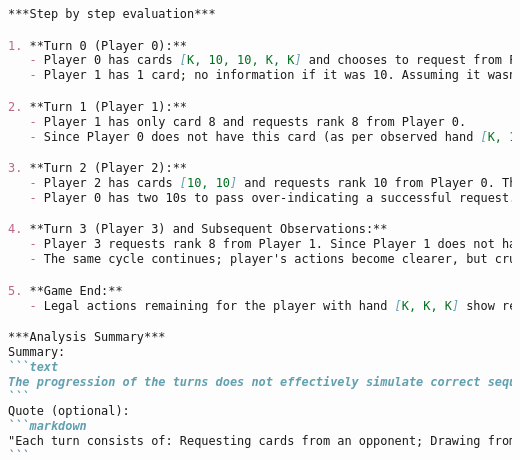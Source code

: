 \begin{tcolorbox}[
breakable,
title=Consistency validation results,  
colframe=gray, 
colback=white,
]
\begin{lstlisting}[language=markdown]
***Step by step evaluation***

1. **Turn 0 (Player 0):**
   - Player 0 has cards [K, 10, 10, K, K] and chooses to request from Player 1 the rank 10. This is legal because Player 0 has cards of rank 10.
   - Player 1 has 1 card; no information if it was 10. Assuming it wasn't, Player 0 should "Go Fish," but the stock is empty. The turn ends.

2. **Turn 1 (Player 1):**
   - Player 1 has only card 8 and requests rank 8 from Player 0.
   - Since Player 0 does not have this card (as per observed hand [K, 10, 10, K, K]), the request fails, but again no stock to draw from. The turn ends.

3. **Turn 2 (Player 2):**
   - Player 2 has cards [10, 10] and requests rank 10 from Player 0. This action is valid since they have rank 10 cards.
   - Player 0 has two 10s to pass over-indicating a successful request. Player 2 should take another turn but this is not visible.

4. **Turn 3 (Player 3) and Subsequent Observations:**
   - Player 3 requests rank 8 from Player 1. Since Player 1 does not have the rank (hand size is 1, card 8 not explicitly confirmed), the turn would typically result in "Go Fish."
   - The same cycle continues; player's actions become clearer, but crucial observations like drawn or obtained cards are missing, suggesting errors in turn execution.

5. **Game End:**
   - Legal actions remaining for the player with hand [K, K, K] show remaining possibilities accurately. No correct handling of potential book formation or reattempts captured.

***Analysis Summary***
Summary:
```text
The progression of the turns does not effectively simulate correct sequence dictated by rules, notably in request fulfillment and subsequent actions not following successful card claims due to incomplete turn handling. Data missing for card exchanges leads to incongruity with established gameplay mechanics.
```
Quote (optional):
```markdown
"Each turn consists of: Requesting cards from an opponent; Drawing from the stock if the request results in 'Go Fish'; Optionally revealing a book if completed; Passing the turn after drawing or failing to make a catch. Re-attempt: If a player successfully gets cards, they can continue asking for the same or different rank."
```
\end{lstlisting}
\end{tcolorbox}